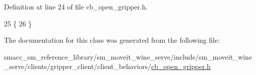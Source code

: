 Definition at line 24 of file cb\+\_\+open\+\_\+gripper.\+h.


\begin{DoxyCode}
25     \{
26     \}
\end{DoxyCode}


The documentation for this class was generated from the following file\+:\begin{DoxyCompactItemize}
\item 
smacc\+\_\+sm\+\_\+reference\+\_\+library/sm\+\_\+moveit\+\_\+wine\+\_\+serve/include/sm\+\_\+moveit\+\_\+wine\+\_\+serve/clients/gripper\+\_\+client/client\+\_\+behaviors/\hyperlink{sm__moveit__wine__serve_2include_2sm__moveit__wine__serve_2clients_2gripper__client_2client__behaviors_2cb__open__gripper_8h}{cb\+\_\+open\+\_\+gripper.\+h}\end{DoxyCompactItemize}
